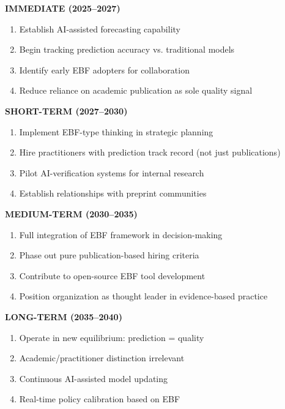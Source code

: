 \begin{tcolorbox}[colback=red!5!white, colframe=red!75!black,
    title=\textbf{DECISION MATRIX: Actions by Time Horizon}]

\textbf{IMMEDIATE (2025--2027)}
\begin{enumerate}[nosep]
\item Establish AI-assisted forecasting capability
\item Begin tracking prediction accuracy vs. traditional models
\item Identify early EBF adopters for collaboration
\item Reduce reliance on academic publication as sole quality signal
\end{enumerate}

\textbf{SHORT-TERM (2027--2030)}
\begin{enumerate}[nosep]
\item Implement EBF-type thinking in strategic planning
\item Hire practitioners with prediction track record (not just publications)
\item Pilot AI-verification systems for internal research
\item Establish relationships with preprint communities
\end{enumerate}

\textbf{MEDIUM-TERM (2030--2035)}
\begin{enumerate}[nosep]
\item Full integration of EBF framework in decision-making
\item Phase out pure publication-based hiring criteria
\item Contribute to open-source EBF tool development
\item Position organization as thought leader in evidence-based practice
\end{enumerate}

\textbf{LONG-TERM (2035--2040)}
\begin{enumerate}[nosep]
\item Operate in new equilibrium: prediction = quality
\item Academic/practitioner distinction irrelevant
\item Continuous AI-assisted model updating
\item Real-time policy calibration based on EBF
\end{enumerate}

\end{tcolorbox}

